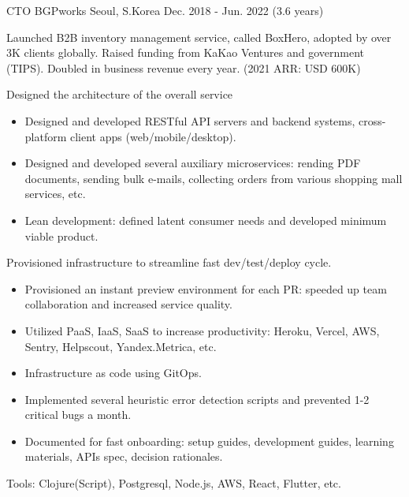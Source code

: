 

\begin{cventries}

  \cventry
    {CTO} %
    {BGPworks} %
    {Seoul, S.Korea} %
    {Dec. 2018 - Jun. 2022 (3.6 years)} %
    {
      Launched B2B inventory management service, called BoxHero, adopted by over 3K clients globally. Raised funding from KaKao Ventures and government (TIPS). Doubled in business revenue every year. (2021 ARR: USD 600K)\newline
      \vspace{6mm}
      \begin{cvitems} %
        \item Designed the architecture of the overall service
        \begin{itemize}[leftmargin=2ex]
          \item Designed and developed RESTful API servers and backend systems, cross-platform client apps (web/mobile/desktop).
          \item Designed and developed several auxiliary microservices: rending PDF documents, sending bulk e-mails, collecting orders from various shopping mall services, etc.
          \item Lean development: defined latent consumer needs and developed minimum viable product.
        \end{itemize}
        \item Provisioned infrastructure to streamline fast dev/test/deploy cycle.
        \begin{itemize}[leftmargin=2ex]
          \item Provisioned an instant preview environment for each PR: speeded up team collaboration and increased service quality.
          \item Utilized PaaS, IaaS, SaaS to increase productivity: Heroku, Vercel, AWS, Sentry, Helpscout, Yandex.Metrica, etc.
          \item Infrastructure as code using GitOps.
          \item Implemented several heuristic error detection scripts and prevented 1-2 critical bugs a month.
          \item Documented for fast onboarding: setup guides, development guides, learning materials, APIs spec, decision rationales.
        \end{itemize}
        \item Tools: Clojure(Script), Postgresql, Node.js, AWS, React, Flutter, etc.
      \end{cvitems}
    }


\end{cventries}
